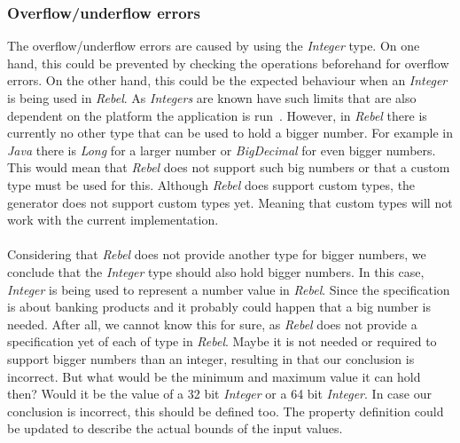 \subsubsection{Overflow/underflow errors}
The overflow/underflow errors are caused by using the \textit{Integer} type. On
one hand, this could be prevented by checking the
operations beforehand for overflow errors. On the other hand, this could be the
expected behaviour when an \textit{Integer} is being used in \textit{Rebel}. As
\textit{Integers} are known have such limits that are also dependent on the
platform the application is run~\cite{wang2009intscope}. However, in
\textit{Rebel} there is currently no other type that can be used to hold a
bigger number. For example in \textit{Java} there is \textit{Long} for a larger
number or \textit{BigDecimal} for even bigger numbers. This would mean that
\textit{Rebel} does not support such big numbers or that a custom type must be used
for this. Although \textit{Rebel} does support custom types, the generator does
not support custom types yet. Meaning that custom types will not work with the
current implementation.\\
\\
Considering that \textit{Rebel} does not provide another type for
bigger numbers, we conclude that the \textit{Integer} type should also
hold bigger numbers. In this case, \textit{Integer} is being used to represent a
number value in \textit{Rebel}. Since the specification is about banking
products and it probably could happen that a big number is needed. After all, we
cannot know this for sure, as \textit{Rebel} does not provide a specification
yet of each of type in \textit{Rebel}. Maybe it is not needed or required to
support bigger numbers than an integer, resulting in that our conclusion is
incorrect. But what would be the minimum and maximum value it can hold then? Would it be the
value of a 32 bit \textit{Integer} or a 64 bit \textit{Integer}. In case our conclusion is
incorrect, this should be defined too. The property definition could be updated
to describe the actual bounds of the input values.

